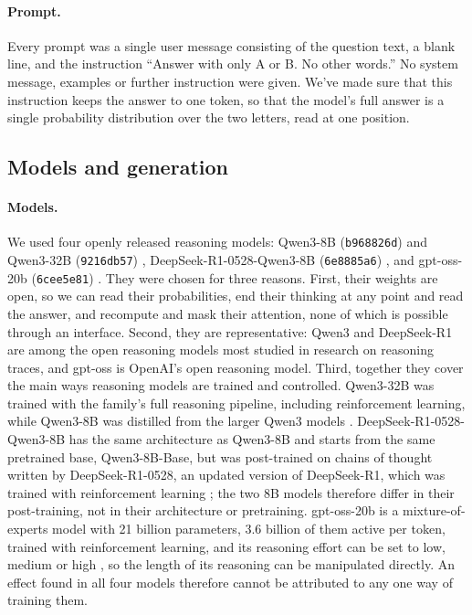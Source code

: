 \documentclass[11pt]{article}
\begin{document}
\paragraph{Prompt.}
Every prompt was a single user message consisting of the question text, a blank line, and the instruction ``Answer with only A or B. No other words.'' No system message, examples or further instruction were given. We've made sure that this instruction keeps the answer to one token, so that the model's full answer is a single probability distribution over the two letters, read at one position.

\subsection{Models and generation}

\paragraph{Models.}
We used four openly released reasoning models: Qwen3-8B (\texttt{b968826d}) and Qwen3-32B (\texttt{9216db57}) \citep{yang2025qwen3}, DeepSeek-R1-0528-Qwen3-8B (\texttt{6e8885a6}) \citep{deepseek2025r1qwen3}, and gpt-oss-20b (\texttt{6cee5e81}) \citep{openai2025gptoss}. They were chosen for three reasons. First, their weights are open, so we can read their probabilities, end their thinking at any point and read the answer, and recompute and mask their attention, none of which is possible through an interface. Second, they are representative: Qwen3 and DeepSeek-R1 are among the open reasoning models most studied in research on reasoning traces, and gpt-oss is OpenAI's open reasoning model. Third, together they cover the main ways reasoning models are trained and controlled. Qwen3-32B was trained with the family's full reasoning pipeline, including reinforcement learning, while Qwen3-8B was distilled from the larger Qwen3 models \citep{yang2025qwen3}. DeepSeek-R1-0528-Qwen3-8B has the same architecture as Qwen3-8B and starts from the same pretrained base, Qwen3-8B-Base, but was post-trained on chains of thought written by DeepSeek-R1-0528, an updated version of DeepSeek-R1, which was trained with reinforcement learning \citep{guo2025deepseek,deepseek2025r1qwen3}; the two 8B models therefore differ in their post-training, not in their architecture or pretraining. gpt-oss-20b is a mixture-of-experts model with 21 billion parameters, 3.6 billion of them active per token, trained with reinforcement learning, and its reasoning effort can be set to low, medium or high \citep{openai2025gptoss}, so the length of its reasoning can be manipulated directly. An effect found in all four models therefore cannot be attributed to any one way of training them.
\end{document}
